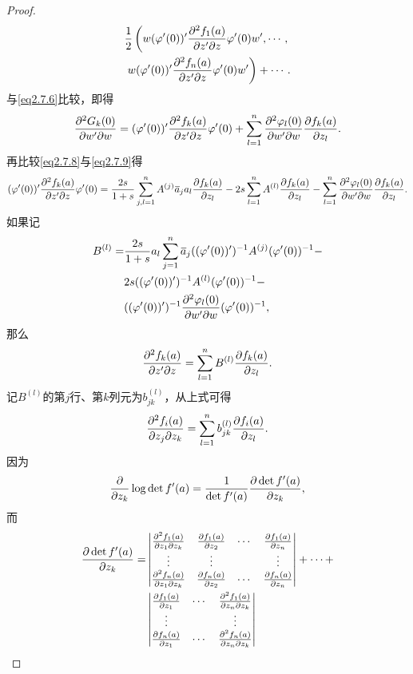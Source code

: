 \begin{proof}
\begin{align*}
	&\frac12\left(w(\varphi'(0))'\frac{\partial^2 f_1(a)}{\partial z'\partial z}\varphi'(0)w',\cdots,\right.\\
	&\left. w(\varphi'(0))'\frac{\partial^2 f_n(a)}{\partial z'\partial z}\varphi'(0)w'\right)+\cdots.
\end{align*}
与\eqref{eq2.7.6}比较，即得
\begin{equation}\label{eq2.7.9}
	\frac{\partial^2 G_k(0)}{\partial w'\partial w}=
	(\varphi'(0))'\frac{\partial^2 f_k(a)}{\partial z'\partial z}\varphi'(0)+\sum_{l=1}^{n}\frac{\partial^2 \varphi_l(0)}{\partial w'\partial w}\frac{\partial f_k(a)}{\partial z_l}.
\end{equation}
再比较\eqref{eq2.7.8}与\eqref{eq2.7.9}得
\[(\varphi'(0))'\frac{\partial^2 f_k(a)}{\partial z'\partial z}\varphi'(0)=
\frac{2s}{1+s}\sum_{j,l=1}^{n}A^{(j)}{}\mkern1mu\overline{\mkern-1mua}_j a_l\frac{\partial f_k(a)}{\partial z_l}-2s\sum_{l=1}^{n}A^{(l)}\frac{\partial f_k(a)}{\partial z_l}-\sum_{l=1}^{n}\frac{\partial^2 \varphi_l(0)}{\partial w'\partial w}\frac{\partial f_k(a)}{\partial z_l}.\]
如果记
\begin{align}\label{eq2.7.10}
	B^{(l)}=
	&\frac{2s}{1+s}a_l\sum_{j=1}^{n}{}\mkern1mu\overline{\mkern-1mua}_j((\varphi'(0))')^{-1}A^{(j)}(\varphi'(0))^{-1}-\notag\\
	&2s((\varphi'(0))')^{-1}A^{(l)}(\varphi'(0))^{-1}-\notag\\
	&((\varphi'(0))')^{-1}\frac{\partial^2 \varphi_l(0)}{\partial w'\partial w}(\varphi'(0))^{-1},
\end{align}
那么
\[\frac{\partial^2 f_k(a)}{\partial z'\partial z}=\sum_{l=1}^{n}B^{(l)}\frac{\partial f_k(a)}{\partial z_l}.\]
记$B^{(l)}$的第$j$行、第$k$列元为$b_{jk}^{(l)}$，从上式可得
\begin{equation}\label{eq2.7.11}
	\frac{\partial^2 f_i(a)}{\partial z_j\partial z_k}=\sum_{l=1}^{n}b_{jk}^{(l)}\frac{\partial f_i(a)}{\partial z_l}.
\end{equation}
因为
\begin{equation}\label{eq2.7.12}
	\frac{\partial }{\partial z_k}\log\det f'(a)=\frac1{\det f'(a)}\frac{\partial \det f'(a)}{\partial z_k},
\end{equation}
而
\begin{align*}
	\pp{\det f'(a)}{z_k}=
	&\begin{vmatrix}
		\pppp{f_1(a)}{z_1}{z_k} & \pp{f_1(a)}{z_2} & \cdots & \pp{f_1(a)}{z_n}\\
		\vdots & \vdots & &\vdots\\
		\pppp{f_n(a)}{z_1}{z_k} & \pp{f_n(a)}{z_2} & \cdots & \pp{f_n(a)}{z_n}
	\end{vmatrix}+\cdots+\\
&\begin{vmatrix}
	\pp{f_1(a)}{z_1} & \cdots & \pppp{f_1(a)}{z_n}{z_k}\\
	\vdots & &\vdots\\
	\pp{f_n(a)}{z_1} & \cdots & \pppp{f_n(a)}{z_n}{z_k}
\end{vmatrix}\\

\end{align*}
\end{proof}
